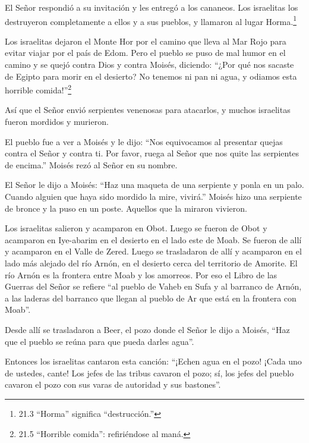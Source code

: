  El Señor respondió a su invitación y les entregó a los
cananeos. Los israelitas los destruyeron completamente a ellos y a sus
pueblos, y llamaron al lugar Horma.\footnote{21.3 ``Horma'' significa
  ``destrucción.''}

 Los israelitas dejaron el Monte Hor por el camino que lleva
al Mar Rojo para evitar viajar por el país de Edom. Pero el pueblo se
puso de mal humor en el camino  y se quejó contra Dios y
contra Moisés, diciendo: ``¿Por qué nos sacaste de Egipto para morir en
el desierto? No tenemos ni pan ni agua, y odiamos esta horrible
comida!''\footnote{21.5 ``Horrible comida'': refiriéndose al maná.}

 Así que el Señor envió serpientes venenosas para atacarlos,
y muchos israelitas fueron mordidos y murieron.

 El pueblo fue a ver a Moisés y le dijo: ``Nos equivocamos
al presentar quejas contra el Señor y contra ti. Por favor, ruega al
Señor que nos quite las serpientes de encima.'' Moisés rezó al Señor en
su nombre.

 El Señor le dijo a Moisés: ``Haz una maqueta de una
serpiente y ponla en un palo. Cuando alguien que haya sido mordido la
mire, vivirá.''  Moisés hizo una serpiente de bronce y la
puso en un poste. Aquellos que la miraron vivieron.

 Los israelitas salieron y acamparon en Obot. 
Luego se fueron de Obot y acamparon en Iye-abarim en el desierto en el
lado este de Moab.  Se fueron de allí y acamparon en el
Valle de Zered.  Luego se trasladaron de allí y acamparon
en el lado más alejado del río Arnón, en el desierto cerca del
territorio de Amorite. El río Arnón es la frontera entre Moab y los
amorreos.  Por eso el Libro de las Guerras del Señor se
refiere ``al pueblo de Vaheb en Sufa y al barranco de Arnón,
 a las laderas del barranco que llegan al pueblo de Ar que
está en la frontera con Moab''.

 Desde allí se trasladaron a Beer, el pozo donde el Señor
le dijo a Moisés, ``Haz que el pueblo se reúna para que pueda darles
agua''.

 Entonces los israelitas cantaron esta canción: ``¡Echen
agua en el pozo! ¡Cada uno de ustedes, cante!  Los jefes de
las tribus cavaron el pozo; sí, los jefes del pueblo cavaron el pozo con
sus varas de autoridad y sus bastones''.

